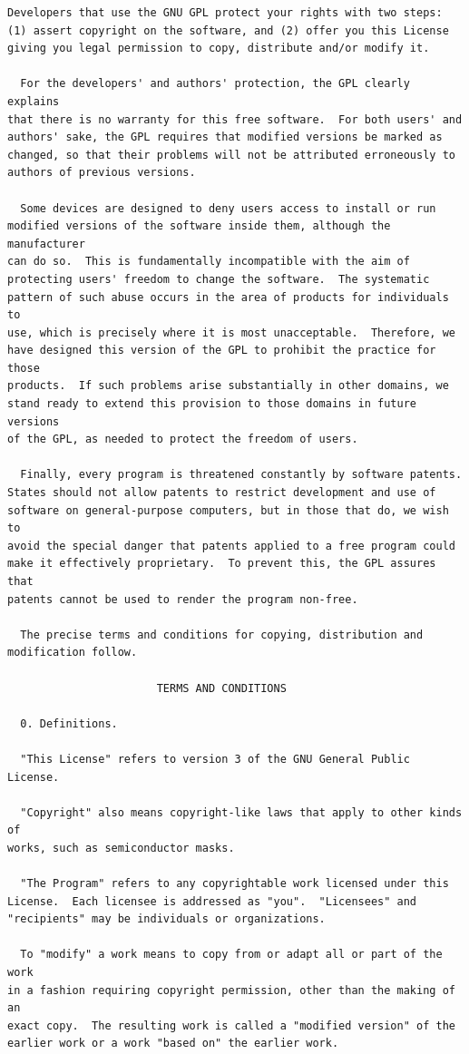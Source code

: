 \documentclass[letterpaper,10pt,english]{sphinxmanual}
\begin{document}
\begin{Verbatim}[commandchars=\\\{\}]
  Developers that use the GNU GPL protect your rights with two steps:
(1) assert copyright on the software, and (2) offer you this License
giving you legal permission to copy, distribute and/or modify it.

  For the developers' and authors' protection, the GPL clearly explains
that there is no warranty for this free software.  For both users' and
authors' sake, the GPL requires that modified versions be marked as
changed, so that their problems will not be attributed erroneously to
authors of previous versions.

  Some devices are designed to deny users access to install or run
modified versions of the software inside them, although the manufacturer
can do so.  This is fundamentally incompatible with the aim of
protecting users' freedom to change the software.  The systematic
pattern of such abuse occurs in the area of products for individuals to
use, which is precisely where it is most unacceptable.  Therefore, we
have designed this version of the GPL to prohibit the practice for those
products.  If such problems arise substantially in other domains, we
stand ready to extend this provision to those domains in future versions
of the GPL, as needed to protect the freedom of users.

  Finally, every program is threatened constantly by software patents.
States should not allow patents to restrict development and use of
software on general-purpose computers, but in those that do, we wish to
avoid the special danger that patents applied to a free program could
make it effectively proprietary.  To prevent this, the GPL assures that
patents cannot be used to render the program non-free.

  The precise terms and conditions for copying, distribution and
modification follow.

                       TERMS AND CONDITIONS

  0. Definitions.

  "This License" refers to version 3 of the GNU General Public License.

  "Copyright" also means copyright-like laws that apply to other kinds of
works, such as semiconductor masks.

  "The Program" refers to any copyrightable work licensed under this
License.  Each licensee is addressed as "you".  "Licensees" and
"recipients" may be individuals or organizations.

  To "modify" a work means to copy from or adapt all or part of the work
in a fashion requiring copyright permission, other than the making of an
exact copy.  The resulting work is called a "modified version" of the
earlier work or a work "based on" the earlier work.


\end{Verbatim}
\end{document}
